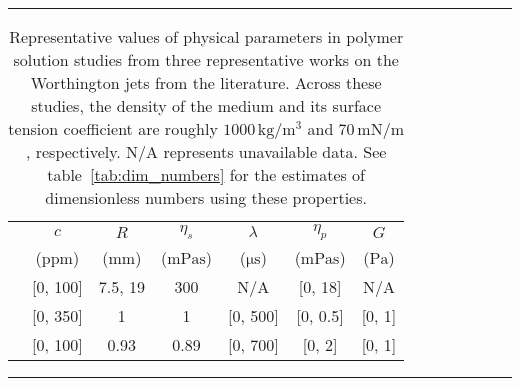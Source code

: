 \documentclass[]{article}
\begin{document}
\begin{enumerate}
\begin{itemize}
	\end{itemize}
	\noindent\rule{\textwidth}{0.75pt}
	\begin{table}[h]
		\begin{center}
			\begin{tabular}{lcccccc}
				&$c$ & $R$ & $\eta_s$  & $\lambda$ & $\eta_p$ & $G$ \\
				& (ppm) & ($\si{\milli\meter}$) & ($\si{\milli\pascal\second}$) & ($\si{\micro\second}$) & ($\si{\milli\pascal\second}$) & ($\si{\pascal}$) \\[3pt]
				\citet{cheny1996extravagant} & [0, 100]  & 7.5, 19  & 300   & N/A & [0, 18] & N/A \\
				\citet{rodriguez2023bubble} & [0, 350] & 1 & 1  & [0, 500] & [0, 0.5] & [0, 1] \\
				\citet{cabalganteeffect} & [0, 100] & 0.93 & 0.89 & [0, 700] & [0, 2] &[0, 1] \\
			\end{tabular}
			\caption{Representative values of physical parameters in polymer solution studies from three representative works on the Worthington jets from the literature. Across these studies, the density of the medium and its surface tension coefficient are roughly $1000\,\si{\kilogram}/\si{\cubic\meter}$ and $70\,\si{\milli\newton}/\si{\meter}$, respectively. N/A represents unavailable data. See table~\ref{tab:dim_numbers} for the estimates of dimensionless numbers using these properties.}
			\label{tab:ExpOnlydim_numbers}
		\end{center}
	\end{table}

\noindent\rule{\textwidth}{0.75pt}
	

\end{enumerate}
\end{document}
